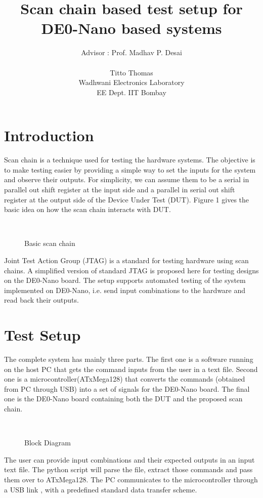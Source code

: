 \documentclass[a4paper,11pt]{article}
\title{\textbf{Scan chain based test setup for\\ DE0-Nano based systems}}
\author{Advisor : Prof. Madhav P. Desai \\ \\Titto Thomas \\ Wadhwani Electronics Laboratory \\ EE Dept. IIT Bombay}
\begin{document}
\maketitle

\section{Introduction}
Scan chain is a technique used for testing the hardware systems. The objective is to make testing easier by providing a simple way to set the inputs for the system and observe their outputs. For simplicity, we can assume them to be a serial in parallel out shift register at the input side and a parallel in serial out shift register at the output side of the Device Under Test (DUT). Figure 1 gives the basic idea on how the scan chain interacts with DUT.

\begin{figure}[h!]
\centering
\\
\caption{Basic scan chain}
\end{figure}

Joint Test Action Group (JTAG)\cite{JTAG} is a standard for testing hardware using scan chains. A simplified version of standard JTAG is proposed here for testing designs on the DE0-Nano board. The setup supports automated testing of the system implemented on DE0-Nano, i.e. send input combinations to the hardware and read back their outputs. 


\section{Test Setup}
The complete system has mainly three parts. The first one is a software running on the host PC that gets the command inputs from the user in a text file. Second one is a microcontroller(ATxMega128) that converts the commands (obtained from PC through USB) into a set of signals for the DE0-Nano board. The final one is the DE0-Nano board containing both the DUT and the proposed scan chain.

\begin{figure}[h!]
\centering
\\
\caption{Block Diagram}
\end{figure}

The user can provide input combinations and their expected outputs in an input text file. The python script will parse the file, extract those commands and pass them over to ATxMega128. The PC communicates to the microcontroller through a USB link , with a predefined standard data transfer scheme. 
\end{document}
